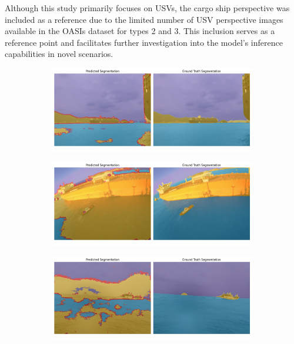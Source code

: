 Although this study primarily focuses on USVs, the cargo ship perspective was included as a reference due to the 
limited number of USV perspective images available in the OASIs dataset for types 2 and 3. This inclusion serves 
as a reference point and facilitates further investigation into the model's inference capabilities in novel scenarios. 
\begin{figure}[ht!]
    \centering
    \begin{subfigure}[h]{0.49\textwidth} \centering
        \includegraphics[width=0.99\textwidth]{figures/OASIs/SegNet-type1-91.png}
        \caption{}
    \end{subfigure} \hspace{-10mm}
    \begin{subfigure}[h]{0.49\textwidth} \centering
        \includegraphics[width=0.99\textwidth]{figures/OASIs/SegNet-type1-23.png}
        \caption{}
    \end{subfigure}
    \begin{subfigure}[h]{0.49\textwidth} \centering
        \includegraphics[width=0.99\textwidth]{figures/OASIs/SegNet-type2-29.png}

\end{subfigure}
\end{figure}

